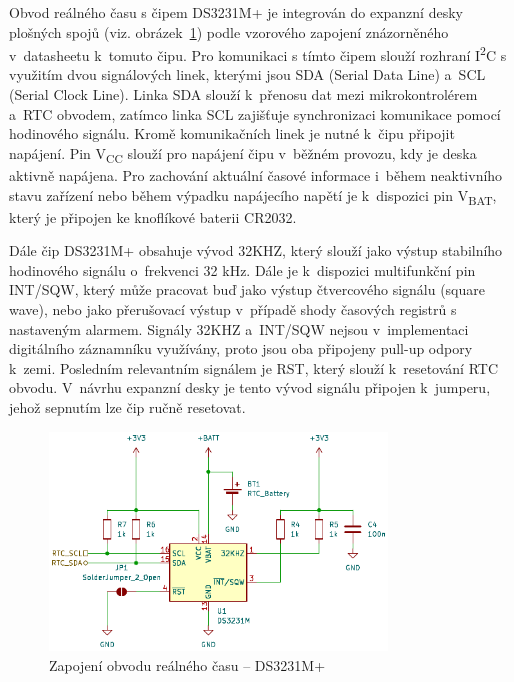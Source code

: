 Obvod reálného času s čipem DS3231M+ je integrován do expanzní desky plošných spojů (viz. obrázek~\ref{fig:ds3231m+}) podle vzorového zapojení znázorněného v~datasheetu k~tomuto čipu. Pro komunikaci s tímto čipem slouží rozhraní I\textsuperscript{2}C s využitím dvou signálových linek, kterými jsou SDA (Serial Data Line) a~SCL (Serial Clock Line). Linka SDA slouží k~přenosu dat mezi mikrokontrolérem a~RTC obvodem, zatímco linka SCL zajišťuje synchronizaci komunikace pomocí hodinového signálu. Kromě komunikačních linek je nutné k~čipu připojit napájení. Pin V\textsubscript{CC} slouží pro napájení čipu v~běžném provozu, kdy je deska aktivně napájena. Pro zachování aktuální časové informace i~během neaktivního stavu zařízení nebo během výpadku napájecího napětí je k~dispozici pin V\textsubscript{BAT}, který je připojen ke knoflíkové baterii CR2032.~\cite{DS3231_manual}

Dále čip DS3231M+ obsahuje vývod 32KHZ, který slouží jako výstup stabilního hodinového signálu o~frekvenci 32 kHz. Dále je k~dispozici multifunkční pin INT/SQW, který může pracovat buď jako výstup čtvercového signálu (square wave), nebo jako přerušovací výstup v~případě shody časových registrů s nastaveným alarmem. Signály 32KHZ a~INT/SQW nejsou v~implementaci digitálního záznamníku využívány, proto jsou oba připojeny pull-up odpory k~zemi. Posledním relevantním signálem je RST, který slouží k~resetování RTC obvodu. V~návrhu expanzní desky je tento vývod signálu připojen k~jumperu, jehož sepnutím lze čip ručně resetovat.~\cite{DS3231_manual}

\begin{figure}[h]
    \centering
    \includegraphics[width=0.80\textwidth]{obrazky-figures/ds3231m+.pdf}
    
    \caption{Zapojení obvodu reálného času -- DS3231M+}
    \label{fig:ds3231m+}
\end{figure}

